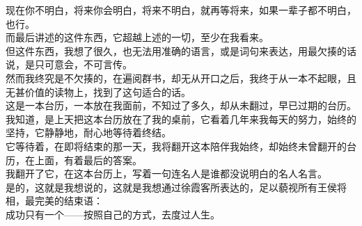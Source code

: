 \begin{multicols}{\theparacolNo}
现在你不明白，将来你会明白，将来不明白，就再等将来，如果一辈子都不明白，也行。\\

而最后讲述的这件东西，它超越上述的一切，至少在我看来。\\

但这件东西，我想了很久，也无法用准确的语言，或是词句来表达，用最欠揍的话说，是只可意会，不可言传。\\

然而我终究是不欠揍的，在遍阅群书，却无从开口之后，我终于从一本不起眼，且无甚价值的读物上，找到了这句适合的话。\\

这是一本台历，一本放在我面前，不知过了多久，却从未翻过，早已过期的台历。\\

我知道，是上天把这本台历放在了我的桌前，它看着几年来我每天的努力，始终的坚持，它静静地，耐心地等待着终结。\\

它等待着，在即将结束的那一天，我将翻开这本陪伴我始终，却始终未曾翻开的台历，在上面，有着最后的答案。\\

我翻开了它，在这本台历上，写着一句连名人是谁都没说明白的名人名言。\\

是的，这就是我想说的，这就是我想通过徐霞客所表达的，足以藐视所有王侯将相，最完美的结束语：\\

成功只有一个——按照自己的方式，去度过人生。\\
\ifnum{}
	\end{multicols}
\fi

